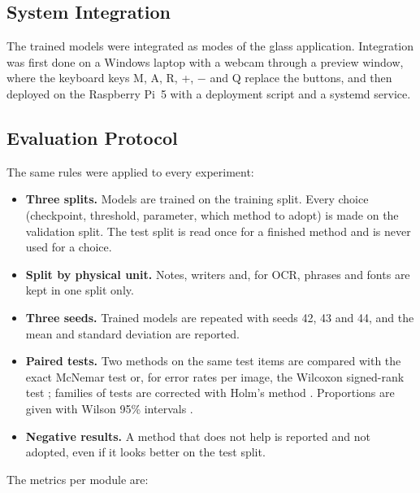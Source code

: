 \subsection{System Integration}
The trained models were integrated as modes of the glass application. Integration was first done on a Windows laptop with a webcam through a preview window, where the keyboard keys M, A, R, +, $-$ and Q replace the buttons, and then deployed on the Raspberry Pi~5 with a deployment script and a systemd service.

\subsection{Evaluation Protocol}
\label{sec:protocol}
The same rules were applied to every experiment:
\begin{itemize}[noitemsep]
    \item \textbf{Three splits.} Models are trained on the training split. Every choice (checkpoint, threshold, parameter, which method to adopt) is made on the validation split. The test split is read once for a finished method and is never used for a choice.
    \item \textbf{Split by physical unit.} Notes, writers and, for OCR, phrases and fonts are kept in one split only.
    \item \textbf{Three seeds.} Trained models are repeated with seeds 42, 43 and 44, and the mean and standard deviation are reported.
    \item \textbf{Paired tests.} Two methods on the same test items are compared with the exact McNemar test \cite{mcnemar1947} or, for error rates per image, the Wilcoxon signed-rank test \cite{wilcoxon1945}; families of tests are corrected with Holm's method \cite{holm1979}. Proportions are given with Wilson 95\% intervals \cite{wilson1927}.
    \item \textbf{Negative results.} A method that does not help is reported and not adopted, even if it looks better on the test split.
\end{itemize}
The metrics per module are:

